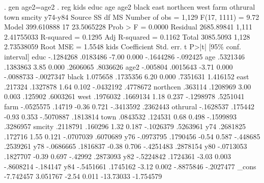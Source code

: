 . gen age2=age{\caret}2
{\smallskip}
. reg kids educ age age2 black east northcen west farm othrural town smcity y74-y84
{\smallskip}
      Source {\VBAR}       SS           df       MS      Number of obs   =     1,129
   F(17, 1111)     =      9.72
       Model {\VBAR}  399.610888        17  23.5065228   Prob > F        =    0.0000
    Residual {\VBAR}  2685.89841     1,111  2.41755033   R-squared       =    0.1295
   Adj R-squared   =    0.1162
       Total {\VBAR}   3085.5093     1,128  2.73538059   Root MSE        =    1.5548
{\smallskip}
        kids {\VBAR} Coefficient  Std. err.      t    P>|t|     [95\% conf. interval]
        educ {\VBAR}  -.1284268   .0183486    -7.00   0.000    -.1644286    -.092425
         age {\VBAR}   .5321346   .1383863     3.85   0.000     .2606065    .8036626
        age2 {\VBAR}   -.005804   .0015643    -3.71   0.000    -.0088733   -.0027347
       black {\VBAR}   1.075658   .1735356     6.20   0.000     .7351631    1.416152
        east {\VBAR}    .217324   .1327878     1.64   0.102    -.0432192    .4778672
    northcen {\VBAR}    .363114   .1208969     3.00   0.003      .125902    .6003261
        west {\VBAR}   .1976032   .1669134     1.18   0.237    -.1298978    .5251041
        farm {\VBAR}  -.0525575     .14719    -0.36   0.721    -.3413592    .2362443
    othrural {\VBAR}  -.1628537    .175442    -0.93   0.353    -.5070887    .1813814
        town {\VBAR}   .0843532    .124531     0.68   0.498    -.1599893    .3286957
      smcity {\VBAR}   .2118791    .160296     1.32   0.187    -.1026379    .5263961
         y74 {\VBAR}   .2681825    .172716     1.55   0.121    -.0707039    .6070689
         y76 {\VBAR}  -.0973795   .1790456    -0.54   0.587     -.448685    .2539261
         y78 {\VBAR}  -.0686665   .1816837    -0.38   0.706    -.4251483    .2878154
         y80 {\VBAR}  -.0713053   .1827707    -0.39   0.697      -.42992    .2873093
         y82 {\VBAR}  -.5224842   .1724361    -3.03   0.003    -.8608214    -.184147
         y84 {\VBAR}  -.5451661   .1745162    -3.12   0.002    -.8875846   -.2027477
       _cons {\VBAR}  -7.742457   3.051767    -2.54   0.011    -13.73033   -1.754579
{\smallskip}
